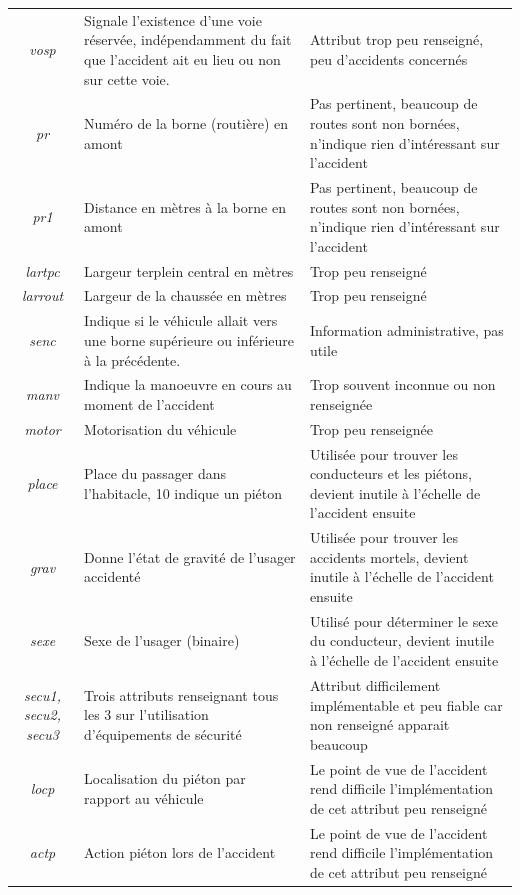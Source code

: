 \documentclass{article}
\begin{document}
\begin{center}
\begin{tabular}{ |c|p{3.5cm}|p{7cm}| }
            \textit{vosp} & Signale l'existence d'une voie réservée, indépendamment du fait que l'accident ait eu lieu ou non sur cette voie. & Attribut trop peu renseigné, peu d'accidents concernés\\
            \textit{pr} & Numéro de la borne (routière) en amont  & Pas pertinent, beaucoup de routes sont non bornées, n'indique rien d'intéressant sur l'accident\\
            \textit{pr1} & Distance en mètres à la borne en amont &  Pas pertinent, beaucoup de routes sont non bornées, n'indique rien d'intéressant sur l'accident\\
            \textit{lartpc} & Largeur terplein central en mètres & Trop peu renseigné\\
            \textit{larrout} & Largeur de la chaussée en mètres & Trop peu renseigné\\
            \textit{senc} & Indique si le véhicule allait vers une borne supérieure ou inférieure à la précédente. & Information administrative, pas utile\\
            \textit{manv} & Indique la manoeuvre en cours au moment de l'accident & Trop souvent inconnue ou non renseignée\\
            \textit{motor} & Motorisation du véhicule & Trop peu renseignée\\
            \textit{place} & Place du passager dans l'habitacle, 10 indique un piéton & Utilisée pour trouver les conducteurs et les piétons, devient inutile à l'échelle de l'accident ensuite\\
            \textit{grav} & Donne l'état de gravité de l'usager accidenté & Utilisée pour trouver les accidents mortels, devient inutile à l'échelle de l'accident ensuite\\
            \textit{sexe} & Sexe de l'usager (binaire) & Utilisé pour déterminer le sexe du conducteur, devient inutile à l'échelle de l'accident ensuite\\
            \textit{secu1, secu2, secu3} & Trois attributs renseignant tous les 3 sur l'utilisation d'équipements de sécurité & Attribut difficilement implémentable et peu fiable car non renseigné apparait beaucoup\\
            \textit{locp} & Localisation du piéton par rapport au véhicule & Le point de vue de l'accident rend difficile l'implémentation de cet attribut peu renseigné\\
            \textit{actp} & Action piéton lors de l'accident & Le point de vue de l'accident rend difficile l'implémentation de cet attribut peu renseigné\\

\end{tabular}
\end{center}
\end{document}
